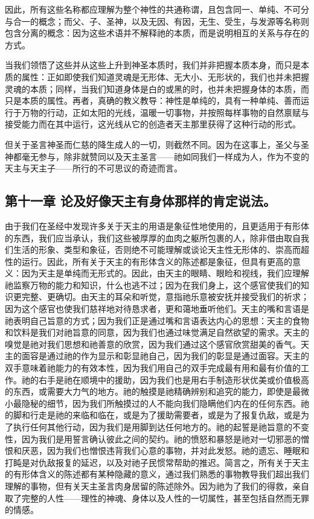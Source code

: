因此，所有这些名称都应理解为整个神性的共通称谓，且包含同一、单纯、不可分与合一的概念；而父、子、圣神，以及无因、有因，无生、受生，与发源等名称则包含分离的概念：因为这些术语并不解释祂的本质，而是说明相互的关系与存在的方式。\par

当我们领悟了这些并从这些上升到神圣本质时，我们并非把握本质本身，而只是本质的属性：正如即使我们知道灵魂是无形体、无大小、无形状的，我们也并未把握灵魂的本质；同样，当我们知道身体是白的或黑的时，也并未把握身体的本质，而只是本质的属性。再者，真确的教义教导：神性是单纯的，具有一种单纯、善而运行于万物的行动，正如太阳的光线，温暖一切事物，并按照每样事物的自然禀赋与接受能力而在其中运行，这光线从它的创造者天主那里获得了这种行动的形式。\par

但关于圣言神圣而仁慈的降生成人的一切，则截然不同。因为在这事上，圣父与圣神都毫无参与，除非就赞同以及天主圣言——祂如同我们一样成为人，作为不变的天主与天主子——所行的不可思议的奇迹而言。\par


\subsection{第十一章 论及好像天主有身体那样的肯定说法。}

由于我们在圣经中发现许多关于天主的用语是象征性地使用的，且更适用于有形体的东西，我们应当承认，我们这些被厚厚的血肉之躯所包裹的人，除非借由取自我们生活的形象、类型和象征，否则绝不可能理解或谈论天主性无形体的、崇高而超性的运行。因此，所有关于天主的有形体含义的陈述都是象征，但具有更高的意义：因为天主是单纯而无形式的。因此，由天主的眼睛、眼睑和视线，我们应理解祂监察万物的能力和知识，什么也逃不过；因为在我们身上，这个感官使我们的知识更完整、更确切。由天主的耳朵和听觉，意指祂乐意被安抚并接受我们的祈求；因为这个感官也使我们慈祥地对待恳求者，更和蔼地垂听他们。天主的嘴和言语是祂表明自己旨意的方式；因为我们正是通过嘴和言语表达内心的思想：天主的食物和饮料是我们对祂旨意的同意，因为我们也通过味觉满足自然欲望的需求。天主的嗅觉是祂对我们思想和祂善意的欣赏，因为我们通过这个感官欣赏甜美的香气。天主的面容是通过祂的作为显示和彰显祂自己，因为我们的彰显是通过面容。天主的双手意味着祂能力的有效本性，因为我们用自己的双手完成最有用和最有价值的工作。祂的右手是祂在顺境中的援助，因为我们也是用右手制造形状优美或价值极高的东西，或需要大力气的地方。祂的触摸是祂精确辨别和追究的能力，即使是最微小最隐秘的细节，因为我们所触摸过的人不能向我们隐瞒他们内在的任何东西。祂的脚和行走是祂的来临和临在，或是为了援助需要者，或是为了报复仇敌，或是为了执行任何其他行动，因为我们是用脚到达任何地方的。祂的起誓是祂旨意的不变性，因为我们是用誓言确认彼此之间的契约。祂的愤怒和暴怒是祂对一切邪恶的憎恨和厌恶，因为我们也憎恨违背我们心意的事物，并对此发怒。祂的遗忘、睡眠和打盹是对仇敌报复的延迟，以及对祂子民惯常帮助的推迟。简言之，所有关于天主的有形体含义的陈述都有某种隐藏的意义，通过我们熟悉的事物教导我们超出我们理解的事物，但有关天主圣言肉身居留的陈述除外。因为祂为了我们的得救，亲自取了完整的人性——理性的神魂、身体以及人性的一切属性，甚至包括自然而无罪的情感。\par

